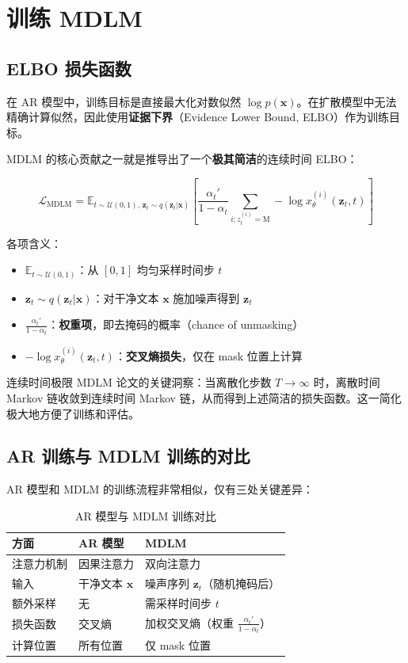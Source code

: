 \section{训练 MDLM}

\subsection{ELBO 损失函数}

在 AR 模型中，训练目标是直接最大化对数似然 $\log p(\mathbf{x})$。在扩散模型中无法精确计算似然，因此使用\textbf{证据下界}（Evidence Lower Bound, ELBO）作为训练目标。

MDLM 的核心贡献之一就是推导出了一个\textbf{极其简洁}的连续时间 ELBO：

$$\mathcal{L}_{\text{MDLM}} = \mathbb{E}_{t \sim \mathcal{U}(0,1), \, \mathbf{z}_t \sim q(\mathbf{z}_t|\mathbf{x})} \left[ \frac{\alpha_t'}{1 - \alpha_t} \sum_{i: z_t^{(i)} = \text{M}} -\log x_\theta^{(i)}(\mathbf{z}_t, t) \right]$$

各项含义：
\begin{itemize}
    \item $\mathbb{E}_{t \sim \mathcal{U}(0,1)}$：从 $[0, 1]$ 均匀采样时间步 $t$
    \item $\mathbf{z}_t \sim q(\mathbf{z}_t | \mathbf{x})$：对干净文本 $\mathbf{x}$ 施加噪声得到 $\mathbf{z}_t$
    \item $\frac{\alpha_t'}{1 - \alpha_t}$：\textbf{权重项}，即去掩码的概率（chance of unmasking）
    \item $-\log x_\theta^{(i)}(\mathbf{z}_t, t)$：\textbf{交叉熵损失}，仅在 mask 位置上计算
\end{itemize}

\begin{importantbox}{连续时间极限}
MDLM 论文的关键洞察：当离散化步数 $T \to \infty$ 时，离散时间 Markov 链收敛到连续时间 Markov 链，从而得到上述简洁的损失函数。这一简化极大地方便了训练和评估。
\end{importantbox}

\subsection{AR 训练与 MDLM 训练的对比}

AR 模型和 MDLM 的训练流程非常相似，仅有三处关键差异：

\begin{table}[H]
\centering
\caption{AR 模型与 MDLM 训练对比}
\begin{tabular}{@{}lll@{}}
\toprule
\textbf{方面} & \textbf{AR 模型} & \textbf{MDLM} \\
\midrule
注意力机制 & 因果注意力 & 双向注意力 \\
输入 & 干净文本 $\mathbf{x}$ & 噪声序列 $\mathbf{z}_t$（随机掩码后） \\
额外采样 & 无 & 需采样时间步 $t$ \\
损失函数 & 交叉熵 & 加权交叉熵（权重 $\frac{\alpha_t'}{1-\alpha_t}$） \\
计算位置 & 所有位置 & 仅 mask 位置 \\
\bottomrule
\end{tabular}
\end{table}

